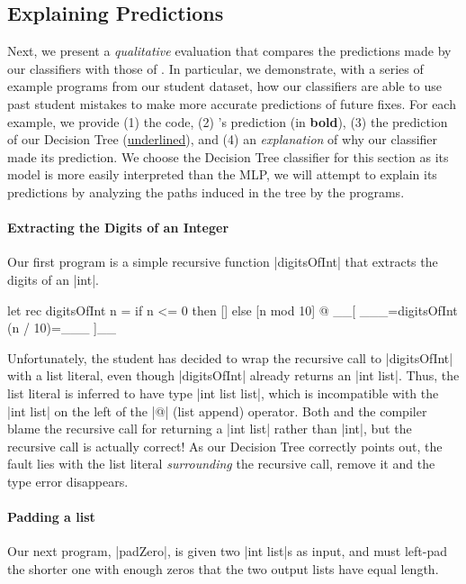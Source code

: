 \subsection{Explaining Predictions}
\label{sec:qualitative}

Next, we present a \emph{qualitative} evaluation that compares the
predictions made by our classifiers with those of \sherrloc.
%
In particular, we demonstrate, with a series of example programs from
our student dataset, how our classifiers are able to use past student
mistakes to make more accurate predictions of future fixes.
%
For each example, we provide
%
(1) the code,
%
(2) \sherrloc's prediction (in \textbf{bold}),
%
(3) the prediction of our Decision Tree (\underline{underlined}), and
%
(4) an \emph{explanation} of why our classifier made its prediction.
%
We choose the Decision Tree classifier for this section as its model
is more easily interpreted than the MLP, we will attempt to explain
its predictions by analyzing the paths induced in the tree by the
programs.
%

\paragraph{Extracting the Digits of an Integer}
Our first program is a simple recursive function |digitsOfInt| that
extracts the digits of an |int|.
%
\begin{ecode}
  let rec digitsOfInt n =
    if n <= 0 then
      []
    else
      [n mod 10] @ __[ ___=digitsOfInt (n / 10)=___ ]__
\end{ecode}
%
Unfortunately, the student has decided to wrap the recursive call to
|digitsOfInt| with a list literal, even though |digitsOfInt| already
returns an |int list|.
%
Thus, the list literal is inferred to have type |int list list|, which
is incompatible with the |int list| on the left of the |@| (list append)
operator.
%
Both \sherrloc and the \ocaml compiler blame the recursive call for
returning a |int list| rather than |int|, but the recursive call is
actually correct!
%
As our Decision Tree correctly points out, the fault lies with the list
literal \emph{surrounding} the recursive call, remove it and the type
error disappears.
%

\paragraph{Padding a list}
Our next program, |padZero|, is given two |int list|s as input, and must
left-pad the shorter one with enough zeros that the two output lists
have equal length.

